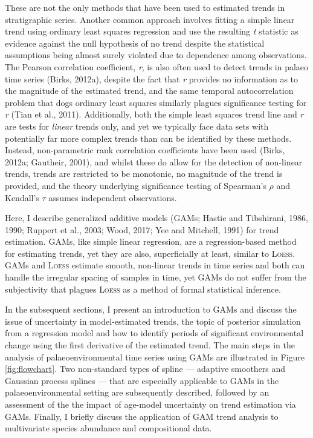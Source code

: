 \documentclass[12pt,]{article}
\newcommand{\loess}{\textsc{Loess}}
\begin{document}
These are not the only methods that have been used to estimated trends
in stratigraphic series. Another common approach involves fitting a
simple linear trend using ordinary least squares regression and use the
resulting \emph{t} statistic as evidence against the null hypothesis of
no trend despite the statistical assumptions being almost surely
violated due to dependence among observations. The Pearson correlation
coefficient, \emph{r}, is also often used to detect trends in palaeo
time series (Birks, 2012a), despite the fact that \emph{r} provides no
information as to the magnitude of the estimated trend, and the same
temporal autocorrelation problem that dogs ordinary least squares
similarly plagues significance testing for \emph{r} (Tian et al., 2011).
Additionally, both the simple least squares trend line and \emph{r} are
tests for \emph{linear} trends only, and yet we typically face data sets
with potentially far more complex trends than can be identified by these
methods. Instead, non-parametric rank correlation coefficients have been
used (Birks, 2012a; Gautheir, 2001), and whilst these do allow for the
detection of non-linear trends, trends are restricted to be monotonic,
no magnitude of the trend is provided, and the theory underlying
significance testing of Spearman's \(\rho\) and Kendall's \(\tau\)
assumes independent observations.

Here, I describe generalized additive models (GAMs; Hastie and
Tibshirani, 1986, 1990; Ruppert et al., 2003; Wood, 2017; Yee and
Mitchell, 1991) for trend estimation. GAMs, like simple linear
regression, are a regression-based method for estimating trends, yet
they are also, superficially at least, similar to \loess{}. GAMs and
\loess{} estimate smooth, non-linear trends in time series and both can
handle the irregular spacing of samples in time, yet GAMs do not suffer
from the subjectivity that plagues \loess{} as a method of formal
statistical inference.

In the subsequent sections, I present an introduction to GAMs and
discuss the issue of uncertainty in model-estimated trends, the topic of
posterior simulation from a regression model and how to identify periods
of significant environmental change using the first derivative of the
estimated trend. The main steps in the analysis of palaeoenvironmental
time series using GAMs are illustrated in Figure \ref{fig:flowchart}.
Two non-standard types of spline --- adaptive smoothers and Gaussian
process splines --- that are especially applicable to GAMs in the
palaeoenvironmental setting are subsequently described, followed by an
assessment of the the impact of age-model uncertainty on trend
estimation via GAMs. Finally, I briefly discuss the application of GAM
trend analysis to multivariate species abundance and compositional data.
\end{document}
